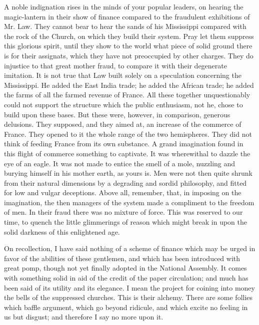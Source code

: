 A noble indignation rises in the minds of your popular leaders, on hearing the magic-lantern in their show of finance compared to the fraudulent exhibitions of Mr. Law. They cannot bear to hear the sands of his Mississippi compared with the rock of the Church, on which they build their system. Pray let them suppress this glorious spirit, until they show to the world what piece of solid ground there is for their assignats, which they have not preoccupied by other charges. They do injustice to that great mother fraud, to compare it with their degenerate imitation. It is not true that Law built solely on a speculation concerning the Mississippi. He added the East India trade; he added the African trade; he added the farms of all the farmed revenue of France. All these together unquestionably could not support the structure which the public enthusiasm, not he, chose to build upon these bases. But these were, however, in comparison, generous delusions. They supposed, and they aimed at, an increase of the commerce of France. They opened to it the whole range of the two hemispheres. They did not think of feeding France from its own substance. A grand imagination found in this flight of commerce something to captivate. It was wherewithal to dazzle the eye of an eagle. It was not made to entice the smell of a mole, nuzzling and burying himself in his mother earth, as yours is. Men were not then quite shrunk from their natural dimensions by a degrading and sordid philosophy, and fitted for low and vulgar deceptions. Above all, remember, that, in imposing on the imagination, the then managers of the system made a compliment to the freedom of men. In their fraud there was no mixture of force. This was reserved to our time, to quench the little glimmerings of reason which might break in upon the solid darkness of this enlightened age.

On recollection, I have said nothing of a scheme of finance which may be urged in favor of the abilities of these gentlemen, and which has been introduced with great pomp, though not yet finally adopted in the National Assembly. It comes with something solid in aid of the credit of the paper circulation; and much has been said of its utility and its elegance. I mean the project for coining into money the bells of the suppressed churches. This is their alchemy. There are some follies which baffle argument, which go beyond ridicule, and which excite no feeling in us but disgust; and therefore I say no more upon it.

